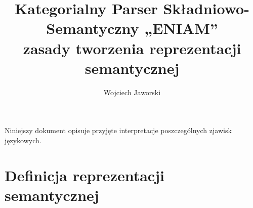 \documentclass[oneside,pwrcover,withmarginpar,hidelinks,11pt]{article}
\title{Kategorialny Parser Składniowo-Semantyczny „ENIAM”\\{\Large zasady tworzenia reprezentacji semantycznej}}
\author{Wojciech Jaworski}
\begin{document}
\maketitle

Niniejszy dokument opisuje przyjęte interpretacje poszczególnych zjawisk językowych.
 
\section{Definicja reprezentacji semantycznej}\label{rep_sem}


\end{document}
